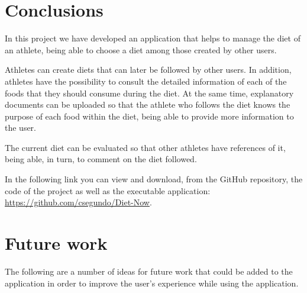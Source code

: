 \noindent

\addtocounter{section}{-2}
\addtocounter{figure}{-1}

\section{Conclusions}
In this project we have developed an application that helps to manage the diet of an athlete, being able to choose a diet among those created by other users. 

Athletes can create diets that can later be followed by other users. In addition, athletes have the possibility to consult the detailed information of each of the foods that they should consume during the diet. At the same time, explanatory documents can be uploaded so that the athlete who follows the diet knows the purpose of each food within the diet, being able to provide more information to the user.

The current diet can be evaluated so that other athletes have references of it, being able, in turn, to comment on the diet followed.


In the following link you can view and download, from the GitHub repository, the code of the project as well as the executable application: \url{https://github.com/csegundo/Diet-Now}.

\section{Future work}
The following are a number of ideas for future work that could be added to the application in order to improve the user's experience while using the application.

